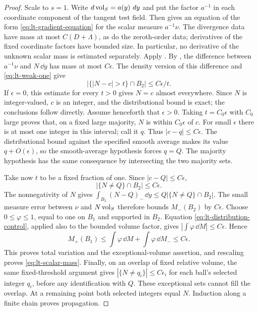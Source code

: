 \begin{proof}
Scale to $s=1$.  Write $\mathop{}\!d\operatorname{vol}_S=a(y)\,\mathop{}\!d y$ and put the factor $a^{-1}$
in each coordinate component of the tangent test field.  Then
 gives an equation of the form
\eqref{eq:lt-gradient-equation} for the scalar measure $a^{-1}\nu$.
The divergence data have mass at most $C(D+\Lambda)$, as do the
zeroth-order data; derivatives of the fixed coordinate factors have bounded
size.  In particular, no derivative of the unknown scalar mass is estimated
separately.  Apply .  By , the difference
between $a^{-1}\nu$ and $N\,\dd y$ has mass at most $C\epsilon$.
The density version of this difference and \eqref{eq:lt-weak-one} give
\[
 |\{|N-c|>t\}\cap B_2|\le C\epsilon/t.
\]
If $\epsilon=0$, this estimate for every $t>0$ gives $N=c$ almost
everywhere.  Since $N$ is integer-valued, $c$ is an integer, and the
distributional bound is exact; the conclusions follow directly.
Assume henceforth that $\epsilon>0$.
Taking $t=C_0\epsilon$ with $C_0$ large proves that, on a fixed large
majority, $N$ is within $C_0\epsilon$ of $c$.  For small $\epsilon$ there
is at most one integer in this interval; call it $q$.  Thus
$|c-q|\le C\epsilon$.  The distributional bound against the specified
smooth average makes its value $q+O(\epsilon)$, so the smooth-average
hypothesis forces $q=Q$.  The majority hypothesis has the same consequence
by intersecting the two majority sets.

Take now $t$ to be a fixed fraction of one.  Since $|c-Q|\le C\epsilon$,
\begin{equation}\label{eq:lt-count-exception}
 |\{N\ne Q\}\cap B_2|\le C\epsilon.
\end{equation}
The nonnegativity of $N$ gives
$\int_{B_2}(N-Q)_-\,\dd y\le Q|\{N\ne Q\}\cap B_2|$.
The small measure error between $\nu$ and $N\operatorname{vol}_S$ therefore bounds
$M_-(B_2)$ by $C\epsilon$.  Choose $0\le\varphi\le1$, equal to one on
$B_1$ and supported in $B_2$.  Equation
\eqref{eq:lt-distribution-control}, applied also to the bounded volume
factor, gives $|\int\varphi\,\dd M|\le C\epsilon$.  Hence
\[
 M_+(B_1)\le\int\varphi\,\dd M+\int\varphi\,\dd M_-
                                                    \le C\epsilon.
\]
This proves total variation and the exceptional-volume assertion, and
rescaling proves \eqref{eq:lt-scalar-mass}.  Finally, on an overlap of fixed
relative volume, the same fixed-threshold argument gives
$|\{N\ne q_i\}|\le C\epsilon_i$ for each ball's selected integer $q_i$,
before any identification with $Q$.  These exceptional sets cannot fill
the overlap.  At a remaining point both selected integers equal $N$.
Induction along a finite chain proves propagation.
\end{proof}

